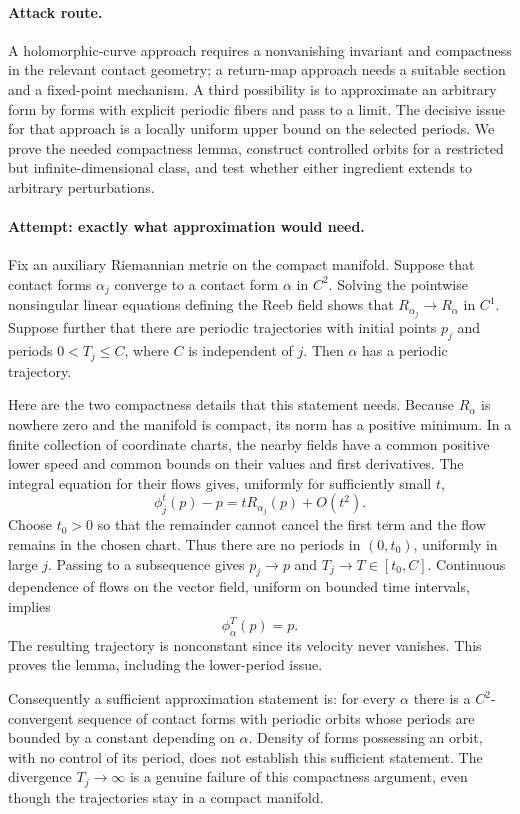 \documentclass[11pt,a4paper]{article}
\numberwithin{equation}{section}
\begin{document}
\paragraph{Attack route.}
A holomorphic-curve approach requires a nonvanishing invariant and compactness
in the relevant contact geometry; a return-map approach needs a suitable
section and a fixed-point mechanism. A third possibility is to approximate
an arbitrary form by forms with explicit periodic fibers and pass to a
limit. The decisive issue for that approach is a locally uniform upper
bound on the selected periods. We prove the needed compactness lemma,
construct controlled orbits for a restricted but infinite-dimensional class,
and test whether either ingredient extends to arbitrary perturbations.

\paragraph{Attempt: exactly what approximation would need.}
Fix an auxiliary Riemannian metric on the compact manifold. Suppose that
contact forms $\alpha_j$ converge to a contact form $\alpha$ in $C^2$.
Solving the pointwise nonsingular linear equations defining the Reeb field
shows that $R_{\alpha_j}\to R_\alpha$ in $C^1$. Suppose further that there
are periodic trajectories with initial points $p_j$ and periods
$0<T_j\le C$, where $C$ is independent of $j$. Then $\alpha$ has a
periodic trajectory.

Here are the two compactness details that this statement needs. Because
$R_\alpha$ is nowhere zero and the manifold is compact, its norm has a
positive minimum. In a finite collection of coordinate charts, the nearby
fields have a common positive lower speed and common bounds on their values
and first derivatives. The integral equation for their flows gives,
uniformly for sufficiently small $t$,
\[
 \phi_j^t(p)-p=tR_{\alpha_j}(p)+O(t^2).
\]
Choose $t_0>0$ so that the remainder cannot cancel the first term and the
flow remains in the chosen chart. Thus there are no periods in $(0,t_0)$,
uniformly in large $j$. Passing to a subsequence gives $p_j\to p$ and
$T_j\to T\in[t_0,C]$. Continuous dependence of flows on the vector field,
uniform on bounded time intervals, implies
\[
                    \phi_\alpha^T(p)=p.
\]
The resulting trajectory is nonconstant since its velocity never vanishes.
This proves the lemma, including the lower-period issue.

Consequently a sufficient approximation statement is: for every $\alpha$
there is a $C^2$-convergent sequence of contact forms with periodic orbits
whose periods are bounded by a constant depending on $\alpha$. Density of
forms possessing an orbit, with no control of its period, does not establish
this sufficient statement. The divergence $T_j\to\infty$ is a genuine
failure of this compactness argument, even though the trajectories stay in
a compact manifold.
\end{document}
